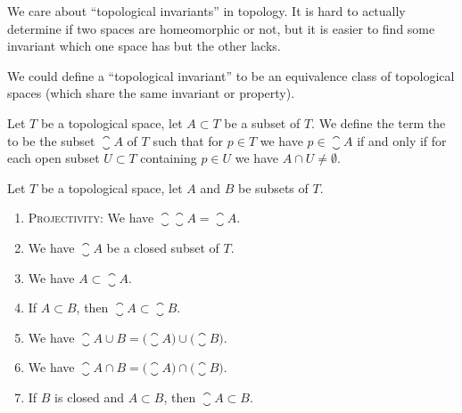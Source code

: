 \begin{remark}
We care about ``topological invariants'' in topology. It is hard to
actually determine if two spaces are homeomorphic or not, but it is
easier to find some invariant which one space has but the other lacks.

We could define a ``topological invariant'' to be an equivalence class
of topological spaces (which share the same invariant or property).
\end{remark}


\begin{definition}
Let $T$ be a topological space, let $A\subset T$ be a subset of $T$.
We define the term the  to be the subset
$\closure{A}$ of $T$ such that
for $p\in T$ we have $p\in\closure{A}$ if and only if for each open
subset $U\subset T$ containing $p\in U$ we have $A\cap U\neq\emptyset$.
\end{definition}

\begin{theorem}
Let $T$ be a topological space, let $A$ and $B$ be subsets of $T$.
\begin{enumerate}
\item\textsc{Projectivity:} We have $\closure{\closure{A}}=\closure{A}$.
\item We have $\closure{A}$ be a closed subset of $T$.
\item We have $A\subset\closure{A}$.
\item If $A\subset B$, then $\closure{A}\subset\closure{B}$.
\item We have $\closure{A\cup B}=\bigl(\closure{A}\bigr)\cup\bigl(\closure{B}\bigr)$.
\item We have $\closure{A\cap B}=\bigl(\closure{A}\bigr)\cap\bigl(\closure{B}\bigr)$.
\item{} If $B$ is closed and $A\subset B$, then $\closure{A}\subset B$.
\end{enumerate}
\end{theorem}


